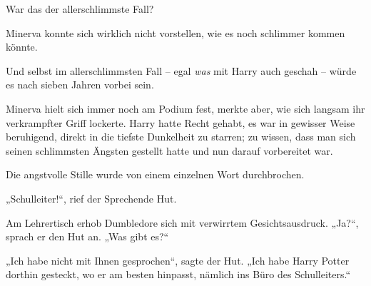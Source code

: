War das der allerschlimmste Fall?

Minerva konnte sich wirklich nicht vorstellen, wie es noch schlimmer kommen könnte.

Und selbst im allerschlimmsten Fall – egal \emph{was} mit Harry auch geschah – würde es nach sieben Jahren vorbei sein.

Minerva hielt sich immer noch am Podium fest, merkte aber, wie sich langsam ihr verkrampfter Griff lockerte. Harry hatte Recht gehabt, es war in gewisser Weise beruhigend, direkt in die tiefste Dunkelheit zu starren; zu wissen, dass man sich seinen schlimmsten Ängsten gestellt hatte und nun darauf vorbereitet war.

Die angstvolle Stille wurde von einem einzelnen Wort durchbrochen.

„Schulleiter!“, rief der Sprechende Hut.

Am Lehrertisch erhob Dumbledore sich mit verwirrtem Gesichtsausdruck. „Ja?“, sprach er den Hut an. „Was gibt es?“

„Ich habe nicht mit Ihnen gesprochen“, sagte der Hut. „Ich habe Harry Potter dorthin gesteckt, wo er am besten hinpasst, nämlich ins Büro des Schulleiters.“

